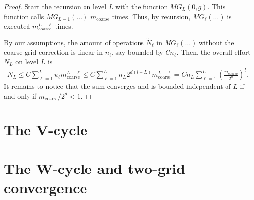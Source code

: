 \begin{proof}
  Start the recursion on level $L$ with the function $MG_L(0,
  g)$. This function calls $MG_{L-1}(\ldots)$ $m_{\text{coarse}}$
  times. Thus, by recursion, $MG_{\ell}(\ldots)$ is executed
  $m_{\text{coarse}}^{L-\ell}$ times.
  
  By our assumptions, the amount of operations $\breve N_\ell$ in $MG_\ell(\ldots)$
  without the coarse grid correction is linear in $n_\ell$, say
  bounded by $Cn_\ell$. Then, the overall effort $N_L$ on level $L$ is
  \begin{gather}
    \label{eq:mg:6}
    N_L \le C \sum_{\ell=1}^L n_\ell m_{\text{coarse}}^{L-\ell} \le C
    \sum_{\ell=1}^L n_L 2^{d(l-L)}m_{\text{coarse}}^{L-\ell}
    = C n_L \sum_{\ell=1}^L \left(\frac{m_{\text{coarse}}}{2^d}\right)^l.
  \end{gather}
  It remains to notice that the sum converges and is bounded
  independent of $L$ if and only if $m_{\text{coarse}}/2^d < 1$.
\end{proof}

\section{The V-cycle}

\section{The W-cycle and two-grid convergence}



